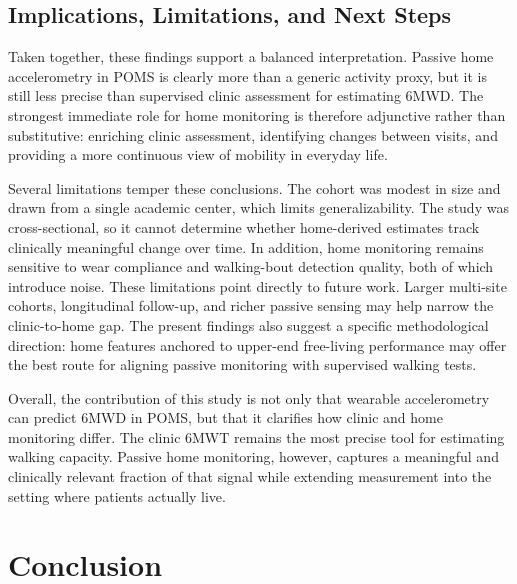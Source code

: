 \documentclass{article}
\begin{document}
\subsection{Implications, Limitations, and Next Steps}

Taken together, these findings support a balanced interpretation. Passive home accelerometry in POMS is clearly more than a generic activity proxy, but it is still less precise than supervised clinic assessment for estimating 6MWD. The strongest immediate role for home monitoring is therefore adjunctive rather than substitutive: enriching clinic assessment, identifying changes between visits, and providing a more continuous view of mobility in everyday life.

Several limitations temper these conclusions. The cohort was modest in size and drawn from a single academic center, which limits generalizability. The study was cross-sectional, so it cannot determine whether home-derived estimates track clinically meaningful change over time. In addition, home monitoring remains sensitive to wear compliance and walking-bout detection quality, both of which introduce noise. These limitations point directly to future work. Larger multi-site cohorts, longitudinal follow-up, and richer passive sensing may help narrow the clinic-to-home gap. The present findings also suggest a specific methodological direction: home features anchored to upper-end free-living performance may offer the best route for aligning passive monitoring with supervised walking tests.

Overall, the contribution of this study is not only that wearable accelerometry can predict 6MWD in POMS, but that it clarifies how clinic and home monitoring differ. The clinic 6MWT remains the most precise tool for estimating walking capacity. Passive home monitoring, however, captures a meaningful and clinically relevant fraction of that signal while extending measurement into the setting where patients actually live.



\section{Conclusion}\label{sec:conclusion}
\end{document}
